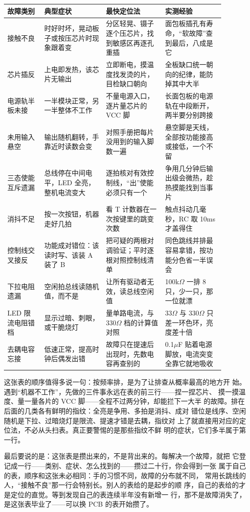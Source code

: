 \begin{longtable}{L{0.15\linewidth}L{0.25\linewidth}L{0.24\linewidth}L{0.24\linewidth}}
\toprule
故障类别 & 典型症状 & 最快定位法 & 实测经验 \\
\midrule
接触不良 & 时好时坏，晃动板子或按压芯片时现象跟着变 & 分区轻晃、镊子逐个压芯片，找到敏感区再逐孔重插 & 面包板插孔有寿命，“软故障”查到最后，八成是它 \\
芯片插反 & 上电即发热，该芯片无输出 & 立即断电，摸温度找发烫的片，目检缺口朝向 & 全板缺口统一朝向的纪律，能防掉其中大半 \\
电源轨半板未接 & 一半模块正常，另一半整体不工作 & 不量电源入口，逐片量芯片的 VCC 脚 & 长面包板的电源轨在中段断开，两半要分别跨接 \\
未用输入悬空 & 输出随机翻转，手靠近时读数会变 & 对照手册把每片没用到的输入脚数一遍 & 悬空脚是天线，全部按功能接高或接低，一个不留 \\
三态使能互斥遗漏 & 总线停在中间电平，LED 全亮，整机电流变大 & 逐拍核对有效控制线，“出”使能必须只有一个 & 争用几分钟后输出级会微热，趁热摸能找到当事片 \\
消抖不足 & 按一次按钮，机器走好几拍 & 看 T 计数器在一次按键里的跳变次数 & 触点抖动几毫秒，RC 取 10ms 才盖得住 \\
控制线交叉接反 & 功能成对错位：该读时写、该装 A 装了 B & 把可疑的两根对调验证；平时逐根对照控制线清单 & 同色跳线并排最容易拿错，按功能分色省一半误会 \\
下拉电阻遗漏 & 空闲拍总线读随机值，而不是  & 让所有驱动者无效，读总线空闲值 & 100k$\Omega$ 一排 8 只，少一只，那一位就漂 \\
LED 限流电阻错档 & 显示过暗、刺眼，或干脆烧灯 & 量单路电流，与 330$\Omega$ 档的计算值对照 & 33$\Omega$ 与 330$\Omega$ 只差一环色环，亮度差十倍 \\
去耦电容忘接 & 低速正常，提高时钟后偶发出错 & 故障只在提速后出现时，先数电容再查别的 & 0.1$\mu$F 贴着电源脚放，电流突变全靠它就地吸收 \\
\bottomrule
\end{longtable}

这张表的顺序值得多说一句：按频率排，是为了让排查从概率最高的地方开
始。遇到“机器不工作”，先做的三件事永远在表的前三行——捏一捏芯片、
摸一摸温度、量一量各片的 VCC 脚——全程不过两分钟，却能拦下一大半
的故障。排在后面的几类各有鲜明的指纹：全亮是争用、多拍是消抖、成对
错位是线序、空闲随机是下拉、过暗烧灯是限流、提速才错是去耦，指纹对
上了就直接用对应的定位法，不必从头扫表。真正要警惕的是那些指纹不鲜
明的症状，它们多半属于第一行。

最后要说的是：这张表是攒出来的，不是背出来的。每解决一个故障，就把
它登记成一行——类别、症状、怎么找到的——攒过二十行，你会得到一张
属于自己的表，顺序和这张未必相同：手的习惯不同，故障的分布就不同，
常用长跳线的人，“接触不良”那一行会特别长。别人的表给的是起步的顺
序，自己的表给的才是定位的直觉。等到发现自己的表连续半年没有新增一
行，那不是故障消失了，是这张表毕业了——可以换 PCB 的表开始攒了。

